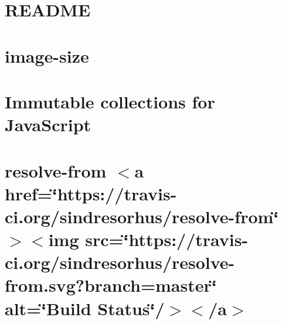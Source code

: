 \documentclass[twoside]{book}
\newcommand{\+}{\discretionary{\mbox{\scriptsize$\hookleftarrow$}}{}{}}
\begin{document}
\chapter{README}
\label{md__c___users_vaishnavi_jadhav__desktop__developer_code_mean_stack_example_client_node_modules_ignore__r_e_a_d_m_e}

\chapter{image-\/size}
\label{md__c___users_vaishnavi_jadhav__desktop__developer_code_mean_stack_example_client_node_modules_image_size__readme}

\chapter{Immutable collections for Java\+Script}
\label{md__c___users_vaishnavi_jadhav__desktop__developer_code_mean_stack_example_client_node_modules_immutable__r_e_a_d_m_e}

\chapter{resolve-\/from \texorpdfstring{$<$}{<}a href=\char`\"{}https\+://travis-\/ci.\+org/sindresorhus/resolve-\/from\char`\"{} \texorpdfstring{$>$}{>}\texorpdfstring{$<$}{<}img src=\char`\"{}https\+://travis-\/ci.\+org/sindresorhus/resolve-\/from.\+svg?branch=master\char`\"{} alt=\char`\"{}\+Build Status\char`\"{}/\texorpdfstring{$>$}{>}\texorpdfstring{$<$}{<}/a\texorpdfstring{$>$}{>}}
\label{md__c___users_vaishnavi_jadhav__desktop__developer_code_mean_stack_example_client_node_modules_id350d42723569fba005470bbbe3f823f}

\end{document}
